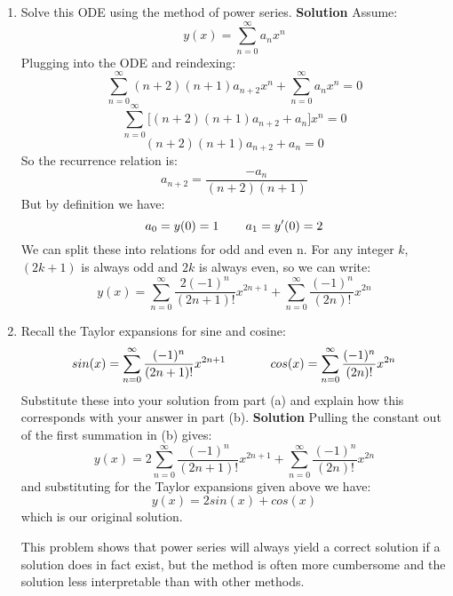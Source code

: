 \documentclass[letterpaper, fontsize=11pt]{scrartcl} %
\numberwithin{equation}{section} %
\numberwithin{figure}{section} %
\numberwithin{table}{section} %
\begin{document}
\begin{enumerate}
\begin{enumerate}
\item Solve this ODE using the method of power series. \newline
\textbf{Solution} \newline
Assume:
$$ y(x) =  \sum\limits_{n=0}^\infty a_n x^n$$
Plugging into the ODE and reindexing:
$$  \sum\limits_{n=0}^\infty (n+2)(n+1)a_{n+2} x^n + \sum\limits_{n=0}^\infty a_n x^{n} = 0$$
$$  \sum\limits_{n=0}^\infty \big [ (n+2)(n+1)a_{n+2} +a_n \big ] x^{n} = 0$$
$$ (n+2)(n+1)a_{n+2} +a_n = 0$$
So the recurrence relation is:
$$a_{n+2} = \frac{-a_n}{(n+2)(n+1)}$$
But by definition we have:
$$a_0 = y(0) = 1 \hspace{0.3in} a_1 = y'(0)  = 2$$
We can split these into relations for odd and even n. For any integer $k$, $(2k+1)$ is always odd and $2k$ is always even, so we can write:
$$y(x) = \sum\limits_{n=0}^\infty \frac{2(-1)^n}{(2n+1)!}x^{2n+1} + \sum\limits_{n=0}^\infty \frac{(-1)^n}{(2n)!}x^{2n} $$


\item Recall the Taylor expansions for sine and cosine:
$$sin(x) = \sum\limits_{n=0}^\infty \frac{(-1)^n}{(2n+1)!}x^{2n+1} \hspace{0.5in} cos(x) = \sum\limits_{n=0}^\infty \frac{(-1)^n}{(2n)!}x^{2n}$$
Substitute these into your solution from part (a) and explain how this corresponds with your answer in part (b).\newline
\textbf{Solution} \newline
Pulling the constant out of the first summation in (b) gives:
$$y(x) = 2\sum\limits_{n=0}^\infty \frac{(-1)^n}{(2n+1)!}x^{2n+1} + \sum\limits_{n=0}^\infty \frac{(-1)^n}{(2n)!}x^{2n} $$
and substituting for the Taylor expansions given above we have:
$$y(x) = 2sin(x) + cos(x) $$
which is our original solution.
\par
This problem shows that power series will always yield a correct solution if a solution does in fact exist, but the method is often more cumbersome and the solution less interpretable than with other methods.

\end{enumerate}

\end{enumerate}

\end{document}
